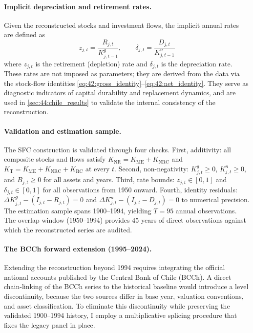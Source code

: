 \paragraph{Implicit depreciation and retirement rates.}
Given the reconstructed stocks and investment flows, the implicit
annual rates are defined as
\begin{equation}
	z_{j,t} = \frac{R_{j,t}}{K^{g}_{j,t-1}},
	\qquad
	\delta_{j,t} = \frac{D_{j,t}}{K^{n}_{j,t-1}}
	\label{eq:42:implicit_rates}
\end{equation}
where $z_{j,t}$ is the retirement (depletion) rate and
$\delta_{j,t}$ is the depreciation rate. These rates are not
imposed as parameters; they are derived from the data via the
stock-flow identities
\eqref{eq:42:gross_identity}--\eqref{eq:42:net_identity}. They
serve as diagnostic indicators of capital durability and
replacement dynamics, and are used in
\cref{sec:44:chile_results} to validate the internal consistency of
the reconstruction.

\paragraph{Validation and estimation sample.}
The SFC construction is validated through four checks. First,
additivity: all composite stocks and flows satisfy
$K_{\text{NR}} = K_{\text{ME}} + K_{\text{NRC}}$ and
$K_{\text{T}} = K_{\text{ME}} + K_{\text{NRC}} + K_{\text{RC}}$
at every $t$. Second, non-negativity: $K^{g}_{j,t} \geq 0$,
$K^{n}_{j,t} \geq 0$, and $B_{j,t} \geq 0$ for all assets and
years. Third, rate bounds: $z_{j,t} \in [0,1]$ and
$\delta_{j,t} \in [0,1]$ for all observations from 1950 onward.
Fourth, identity residuals: $\Delta K^{g}_{j,t} - (I_{j,t} -
R_{j,t}) = 0$ and $\Delta K^{n}_{j,t} - (I_{j,t} - D_{j,t}) = 0$
to numerical precision. The estimation sample spans 1900--1994,
yielding $T = 95$ annual observations. The overlap window
(1950--1994) provides 45 years of direct \citet{Hofman2000b}
observations against which the reconstructed series are audited.

\paragraph{The BCCh forward extension (1995--2024).}
Extending the reconstruction beyond 1994 requires integrating the
official national accounts published by the Central Bank of Chile
(BCCh). A direct chain-linking of the BCCh series to the historical
baseline would introduce a level discontinuity, because the two
sources differ in base year, valuation conventions, and asset
classification. To eliminate this discontinuity while preserving the
validated 1900--1994 history, I employ a multiplicative splicing
procedure that fixes the legacy panel in place.

